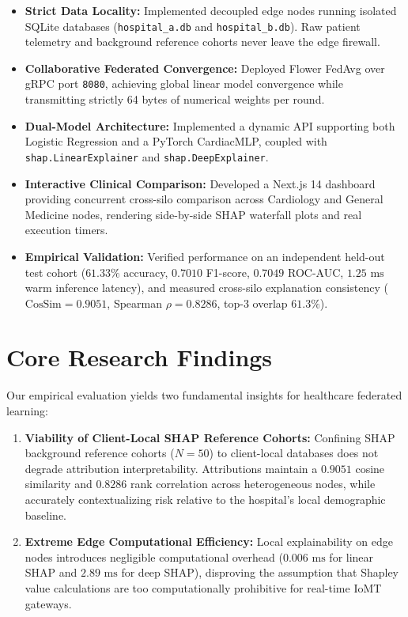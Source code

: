 \documentclass[12pt,a4paper,oneside]{report}
\begin{document}
\begin{itemize}
    \item \textbf{Strict Data Locality:} Implemented decoupled edge nodes running isolated SQLite databases (\texttt{hospital\_a.db} and \texttt{hospital\_b.db}). Raw patient telemetry and background reference cohorts never leave the edge firewall.
    \item \textbf{Collaborative Federated Convergence:} Deployed Flower FedAvg over gRPC port \texttt{8080}, achieving global linear model convergence while transmitting strictly 64 bytes of numerical weights per round.
    \item \textbf{Dual-Model Architecture:} Implemented a dynamic API supporting both Logistic Regression and a PyTorch CardiacMLP, coupled with \texttt{shap.LinearExplainer} and \texttt{shap.DeepExplainer}.
    \item \textbf{Interactive Clinical Comparison:} Developed a Next.js 14 dashboard providing concurrent cross-silo comparison across Cardiology and General Medicine nodes, rendering side-by-side SHAP waterfall plots and real execution timers.
    \item \textbf{Empirical Validation:} Verified performance on an independent held-out test cohort ($61.33\%$ accuracy, $0.7010$ F1-score, $0.7049$ ROC-AUC, $1.25\text{ ms}$ warm inference latency), and measured cross-silo explanation consistency ($\text{CosSim} = 0.9051$, Spearman $\rho = 0.8286$, top-3 overlap $61.3\%$).
\end{itemize}

\section{Core Research Findings}
Our empirical evaluation yields two fundamental insights for healthcare federated learning:
\begin{enumerate}
    \item \textbf{Viability of Client-Local SHAP Reference Cohorts:} Confining SHAP background reference cohorts ($N=50$) to client-local databases does not degrade attribution interpretability. Attributions maintain a $0.9051$ cosine similarity and $0.8286$ rank correlation across heterogeneous nodes, while accurately contextualizing risk relative to the hospital's local demographic baseline.
    \item \textbf{Extreme Edge Computational Efficiency:} Local explainability on edge nodes introduces negligible computational overhead ($0.006\text{ ms}$ for linear SHAP and $2.89\text{ ms}$ for deep SHAP), disproving the assumption that Shapley value calculations are too computationally prohibitive for real-time IoMT gateways.
\end{enumerate}
\end{document}
